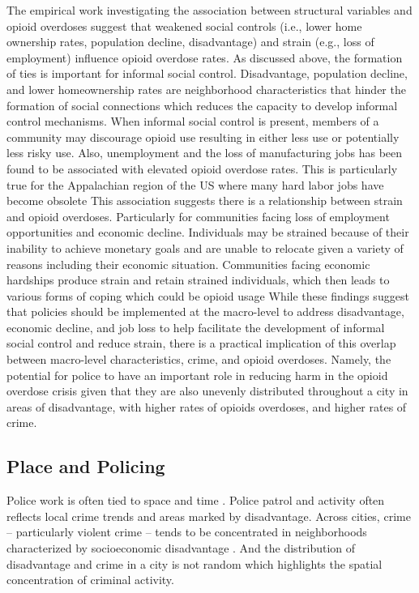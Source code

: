 The empirical work investigating the association between structural variables and opioid overdoses suggest that weakened social controls (i.e., lower home ownership rates, population decline, disadvantage) and strain (e.g., loss of employment) influence opioid overdose rates. As discussed above, the formation of ties is important for informal social control. Disadvantage, population decline, and lower homeownership rates are neighborhood characteristics that hinder the formation of social connections which reduces the capacity to develop informal control mechanisms. When informal social control is present, members of a community may discourage opioid use resulting in either less use or potentially less risky use. Also, unemployment and the loss of manufacturing jobs has been found to be associated with elevated opioid overdose rates. This is particularly true for the Appalachian region of the US where many hard labor jobs have become obsolete \parencite{mclean_theres_2016} This association suggests there is a relationship between strain and opioid overdoses. Particularly for communities facing loss of employment opportunities and economic decline. Individuals may be strained because of their inability to achieve monetary goals and are unable to relocate given a variety of reasons including their economic situation. Communities facing economic hardships produce strain and retain strained individuals, which then leads to various forms of coping which could be opioid usage \parencite{monnat_factors_2018, monnat_contributions_2019} While these findings suggest that policies should be implemented at the macro-level to address disadvantage, economic decline, and job loss to help facilitate the development of informal social control and reduce strain, there is a practical implication of this overlap between macro-level characteristics, crime, and opioid overdoses. Namely, the potential for police to have an important role in reducing harm in the opioid overdose crisis given that they are also unevenly distributed throughout a city in areas of disadvantage, with higher rates of opioids overdoses, and higher rates of crime.

\subsection{Place and Policing}

Police work is often tied to space and time \parencite{fyfe_police_1991}. Police patrol and activity often reflects local crime trends and areas marked by disadvantage. Across cities, crime – particularly violent crime – tends to be concentrated in neighborhoods characterized by socioeconomic disadvantage \parencite{peterson_divergent_2010}. And the distribution of disadvantage and crime in a city is not random \parencite{rothstein_color_2017, weisburd_law_2015} which highlights the spatial concentration of criminal activity. 


